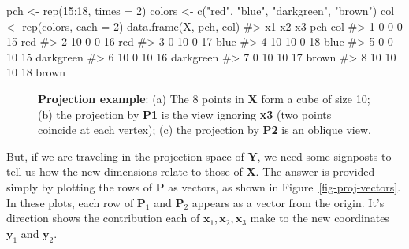 \documentclass[
  letterpaper,
  10pt,
  krantz2]{krantz}
\makeatletter
\newenvironment{Shaded}{\begin{snugshade}}{\end{snugshade}}
\newcommand{\AttributeTok}[1]{\textcolor[rgb]{0.40,0.45,0.13}{#1}}
\newcommand{\CommentTok}[1]{\textcolor[rgb]{0.37,0.37,0.37}{#1}}
\newcommand{\DecValTok}[1]{\textcolor[rgb]{0.68,0.00,0.00}{#1}}
\newcommand{\FunctionTok}[1]{\textcolor[rgb]{0.28,0.35,0.67}{#1}}
\newcommand{\NormalTok}[1]{\textcolor[rgb]{0.00,0.23,0.31}{#1}}
\newcommand{\OtherTok}[1]{\textcolor[rgb]{0.00,0.23,0.31}{#1}}
\newcommand{\SpecialCharTok}[1]{\textcolor[rgb]{0.37,0.37,0.37}{#1}}
\newcommand{\StringTok}[1]{\textcolor[rgb]{0.13,0.47,0.30}{#1}}
\newenvironment{kframe}{%
  \medskip{}
  \setlength{\fboxsep}{.8em}
  \def\at@end@of@kframe{}%
  \ifinner\ifhmode%
  \def\at@end@of@kframe{\end{minipage}}%
  \begin{minipage}{\columnwidth}%
  \fi\fi%
  \def\FrameCommand##1{\hskip\@totalleftmargin \hskip-\fboxsep
  \colorbox{shadecolor}{##1}\hskip-\fboxsep
      \hskip-\linewidth \hskip-\@totalleftmargin \hskip\columnwidth}%
  \MakeFramed {\advance\hsize-\width
    \@totalleftmargin\z@ \linewidth\hsize
    \@setminipage}}%
{\par\unskip\endMakeFramed%
  \at@end@of@kframe}
\renewenvironment{Shaded}{\begin{kframe}}{\end{kframe}}
\makeatother
\begin{document}
\begin{Shaded}
\begin{Highlighting}[]
\NormalTok{pch }\OtherTok{\textless{}{-}} \FunctionTok{rep}\NormalTok{(}\DecValTok{15}\SpecialCharTok{:}\DecValTok{18}\NormalTok{, }\AttributeTok{times =} \DecValTok{2}\NormalTok{)}
\NormalTok{colors }\OtherTok{\textless{}{-}} \FunctionTok{c}\NormalTok{(}\StringTok{"red"}\NormalTok{, }\StringTok{"blue"}\NormalTok{, }\StringTok{"darkgreen"}\NormalTok{, }\StringTok{"brown"}\NormalTok{)}
\NormalTok{col }\OtherTok{\textless{}{-}} \FunctionTok{rep}\NormalTok{(colors, }\AttributeTok{each =} \DecValTok{2}\NormalTok{)}
\FunctionTok{data.frame}\NormalTok{(X, pch, col)}
\CommentTok{\#\textgreater{}   x1 x2 x3 pch       col}
\CommentTok{\#\textgreater{} 1  0  0  0  15       red}
\CommentTok{\#\textgreater{} 2 10  0  0  16       red}
\CommentTok{\#\textgreater{} 3  0 10  0  17      blue}
\CommentTok{\#\textgreater{} 4 10 10  0  18      blue}
\CommentTok{\#\textgreater{} 5  0  0 10  15 darkgreen}
\CommentTok{\#\textgreater{} 6 10  0 10  16 darkgreen}
\CommentTok{\#\textgreater{} 7  0 10 10  17     brown}
\CommentTok{\#\textgreater{} 8 10 10 10  18     brown}
\end{Highlighting}
\end{Shaded}

\begin{figure}


\caption{\label{fig-proj-combined}\textbf{Projection example}: (a) The 8
points in \textbf{X} form a cube of size 10; (b) the projection by
\textbf{P1} is the view ignoring \textbf{x3} (two points coincide at
each vertex); (c) the projection by \textbf{P2} is an oblique view.}

\end{figure}%

But, if we are traveling in the projection space of \(\mathbf{Y}\), we
need some signposts to tell us how the new dimensions relate to those of
\(\mathbf{X}\). The answer is provided simply by plotting the rows of
\(\mathbf{P}\) as vectors, as shown in Figure~\ref{fig-proj-vectors}. In
these plots, each row of \(\mathbf{P}_1\) and \(\mathbf{P}_2\) appears
as a vector from the origin. It's direction shows the contribution each
of \(\mathbf{x}_1, \mathbf{x}_2, \mathbf{x}_3\) make to the new
coordinates \(\mathbf{y}_1\) and \(\mathbf{y}_2\).
\end{document}
